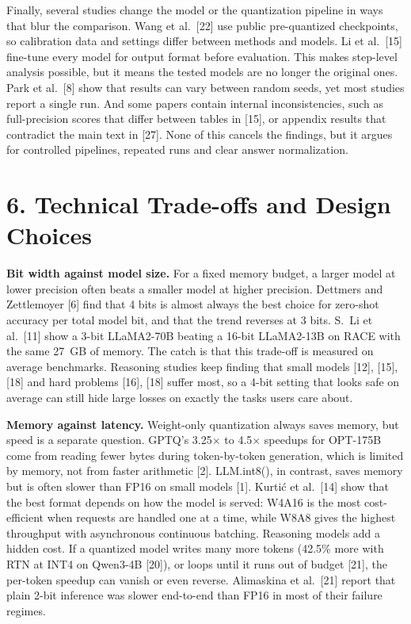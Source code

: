 \documentclass[10pt,twocolumn]{article}
\begin{document}
Finally, several studies change the model or the quantization pipeline
in ways that blur the comparison. Wang et al.~[22] use public
pre-quantized checkpoints, so calibration data and settings differ
between methods and models. Li et al.~[15] fine-tune every model for
output format before evaluation. This makes step-level analysis
possible, but it means the tested models are no longer the original
ones. Park et al.~[8] show that results can vary between random seeds,
yet most studies report a single run. And some papers contain internal
inconsistencies, such as full-precision scores that differ between
tables in [15], or appendix results that contradict the main text in
[27]. None of this cancels the findings, but it argues for controlled
pipelines, repeated runs and clear answer normalization.

\section{6. Technical Trade-offs and Design Choices}

\textbf{Bit width against model size.} For a fixed memory budget, a
larger model at lower precision often beats a smaller model at higher
precision. Dettmers and Zettlemoyer [6] find that 4 bits is almost
always the best choice for zero-shot accuracy per total model bit, and
that the trend reverses at 3 bits. S.~Li et al.~[11] show a 3-bit
LLaMA2-70B beating a 16-bit LLaMA2-13B on RACE with the same 27~GB of
memory. The catch is that this trade-off is measured on average
benchmarks. Reasoning studies keep finding that small models [12], [15],
[18] and hard problems [16], [18] suffer most, so a 4-bit setting that
looks safe on average can still hide large losses on exactly the tasks
users care about.

\textbf{Memory against latency.} Weight-only quantization always saves
memory, but speed is a separate question. GPTQ's 3.25$\times$ to
4.5$\times$ speedups for OPT-175B come from reading fewer bytes during
token-by-token generation, which is limited by memory, not from faster
arithmetic [2]. LLM.int8(), in contrast, saves memory but is often
slower than FP16 on small models [1]. Kurtić et al.~[14] show that the
best format depends on how the model is served: W4A16 is the most
cost-efficient when requests are handled one at a time, while W8A8 gives
the highest throughput with asynchronous continuous batching. Reasoning
models add a hidden cost. If a quantized model writes many more tokens
(42.5\% more with RTN at INT4 on Qwen3-4B [20]), or loops until it runs
out of budget [21], the per-token speedup can vanish or even reverse.
Alimaskina et al.~[21] report that plain 2-bit inference was slower
end-to-end than FP16 in most of their failure regimes.
\end{document}
